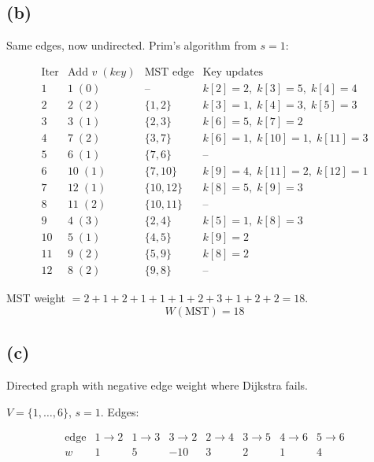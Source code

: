 \documentclass[11pt]{article}
\begin{document}
\vspace{-20pt}
\subsection*{(b)}
\vspace{-10pt}

Same edges, now undirected. Prim's algorithm from $s = 1$:

{\small\[
\begin{array}{c|l|l|l}
\text{Iter} & \text{Add } v\;(key) & \text{MST edge} & \text{Key updates} \\ \hline
1 & 1\;(0) & \text{--} & k[2]{=}2,\; k[3]{=}5,\; k[4]{=}4 \\
2 & 2\;(2) & \{1,2\} & k[3]{=}1,\; k[4]{=}3,\; k[5]{=}3 \\
3 & 3\;(1) & \{2,3\} & k[6]{=}5,\; k[7]{=}2 \\
4 & 7\;(2) & \{3,7\} & k[6]{=}1,\; k[10]{=}1,\; k[11]{=}3 \\
5 & 6\;(1) & \{7,6\} & \text{--} \\
6 & 10\;(1) & \{7,10\} & k[9]{=}4,\; k[11]{=}2,\; k[12]{=}1 \\
7 & 12\;(1) & \{10,12\} & k[8]{=}5,\; k[9]{=}3 \\
8 & 11\;(2) & \{10,11\} & \text{--} \\
9 & 4\;(3) & \{2,4\} & k[5]{=}1,\; k[8]{=}3 \\
10 & 5\;(1) & \{4,5\} & k[9]{=}2 \\
11 & 9\;(2) & \{5,9\} & k[8]{=}2 \\
12 & 8\;(2) & \{9,8\} & \text{--}
\end{array}
\]}

MST weight $= 2+1+2+1+1+1+2+3+1+2+2 = 18$.
\[\boxed{W(\text{MST}) = 18}\]

\vspace{-20pt}
\subsection*{(c)}

Directed graph with negative edge weight where Dijkstra fails.

$V = \{1, \ldots, 6\}$, $s = 1$. Edges:

\[
\begin{array}{c|ccccccc}
\text{edge} & 1 \to 2 & 1 \to 3 & 3 \to 2 & 2 \to 4 & 3 \to 5 & 4 \to 6 & 5 \to 6 \\ \hline
w & 1 & 5 & -10 & 3 & 2 & 1 & 4
\end{array}
\]
\end{document}
